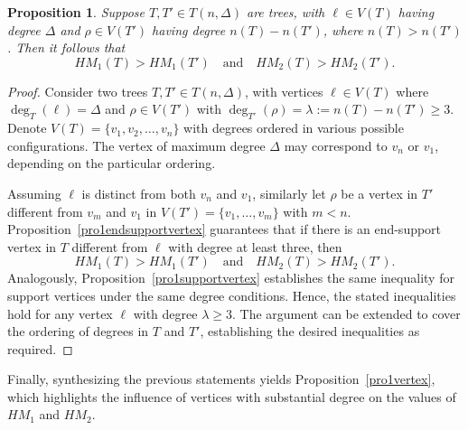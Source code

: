 \documentclass{article}
\newtheorem{proposition}{Proposition}[section]
\theoremstyle{definition}
\begin{document}
\begin{proposition}\label{re1endsupportvertex}
Suppose $T, T' \in T(n, \Delta)$ are trees, with $\ell \in V(T)$ having degree $\Delta$ and $\rho \in V(T')$ having degree $n(T) - n(T')$, where $n(T) > n(T')$. Then it follows that
\[
HM_{1}(T) > HM_{1}(T') \quad \text{and} \quad HM_{2}(T) > HM_{2}(T').
\]
\end{proposition}

\begin{proof}
Consider two trees $T, T' \in T(n, \Delta)$, with vertices $\ell \in V(T)$ where $\deg_T(\ell) = \Delta$ and $\rho \in V(T')$ with $\deg_{T'}(\rho) = \lambda := n(T) - n(T') \geq 3$. Denote $V(T) = \{v_1, v_2, \ldots, v_n\}$ with degrees ordered in various possible configurations. The vertex of maximum degree $\Delta$ may correspond to $v_n$ or $v_1$, depending on the particular ordering.

Assuming $\ell$ is distinct from both $v_n$ and $v_1$, similarly let $\rho$ be a vertex in $T'$ different from $v_m$ and $v_1$ in $V(T') = \{v_1, \ldots, v_m\}$ with $m < n$. Proposition~\ref{pro1endsupportvertex} guarantees that if there is an end-support vertex in $T$ different from $\ell$ with degree at least three, then
\[
HM_1(T) > HM_1(T') \quad \text{and} \quad HM_2(T) > HM_2(T').
\]
Analogously, Proposition~\ref{pro1supportvertex} establishes the same inequality for support vertices under the same degree conditions. Hence, the stated inequalities hold for any vertex $\ell$ with degree $\lambda \geq 3$. The argument can be extended to cover the ordering of degrees in $T$ and $T'$, establishing the desired inequalities as required.
\end{proof}

Finally, synthesizing the previous statements yields Proposition~\ref{pro1vertex}, which highlights the influence of vertices with substantial degree on the values of $HM_1$ and $HM_2$.
\end{document}

